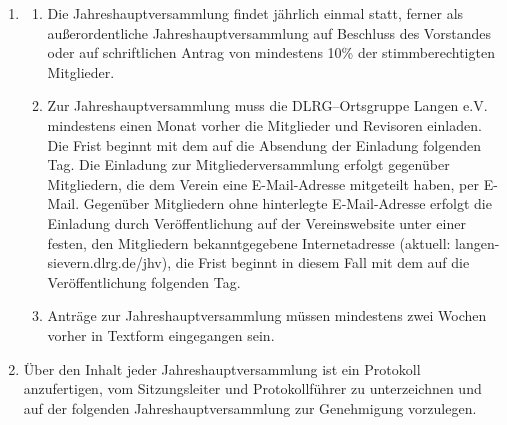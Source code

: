 \documentclass[%
12pt, %
a4paper, %
headsepline, %
parskip, %
headings=normal, %
]{scrreprt}
\begin{document}
\begin{enumerate}
\begin{enumerate}[noitemsep]
        \item Die Jahreshauptversammlung setzt sich aus den Mitgliedern der DLRG--Ortsgruppe Langen~e.V. zusammen.
        \item Jedes stimmberechtigte Mitglied hat eine Stimme. Die Ausübung des Stimmrechts ist geregelt in \ref{sec:mitgliedschaft} Abs. 4 und 5.
      \end{enumerate}
    \item \begin{enumerate}[noitemsep]
        \item Die Jahreshauptversammlung findet jährlich einmal statt, ferner als außerordentliche Jahreshauptversammlung auf Beschluss des Vorstandes oder auf schriftlichen Antrag von mindestens 10\% der stimmberechtigten Mitglieder.
        \item Zur Jahreshauptversammlung muss die DLRG–Ortsgruppe Langen e.V. mindestens einen Monat vorher die Mitglieder und Revisoren einladen. Die Frist beginnt mit dem auf die Absendung der Einladung folgenden Tag. Die Einladung zur Mitgliederversammlung erfolgt gegenüber Mitgliedern, die dem Verein eine E-Mail-Adresse mitgeteilt haben, per E-Mail. Gegenüber Mitgliedern ohne hinterlegte E-Mail-Adresse erfolgt die Einladung durch Veröffentlichung auf der Vereinswebsite unter einer festen, den Mitgliedern bekanntgegebene Internetadresse (aktuell: langen-sievern.dlrg.de/jhv), die Frist beginnt in diesem Fall mit dem auf die Veröffentlichung folgenden Tag.
        \item Anträge zur Jahreshauptversammlung müssen mindestens zwei Wochen vorher in Textform eingegangen sein.
      \end{enumerate}
    \item Über den Inhalt jeder Jahreshauptversammlung ist ein Protokoll anzufertigen, vom Sitzungsleiter und Protokollführer zu unterzeichnen und auf der folgenden Jahreshauptversammlung zur Genehmigung vorzulegen. %
\end{enumerate}
\end{document}
